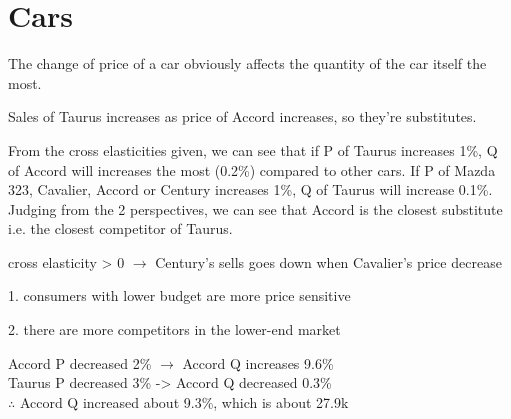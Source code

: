 \documentclass[a4paper]{article}
\begin{document}
    \section{Cars}
    \begin{answer}[Q1]
    The change of price of a car obviously affects the quantity of the car itself the most.
    \end{answer}
    \begin{answer}[Q2]
    Sales of Taurus increases as price of Accord increases, so they're substitutes.
    \end{answer}
    \begin{answer}[Q3]
    From the cross elasticities given, we can see that if P of Taurus increases 1\%, Q of Accord will increases the most (0.2\%) compared to other cars. If P of Mazda 323,  Cavalier, Accord or Century increases 1\%, Q of Taurus will increase 0.1\%. Judging from the 2 perspectives, we can see that Accord is the closest substitute i.e. the closest competitor of Taurus.
    
    \end{answer}
    \begin{answer}[Q4]
    cross elasticity > 0 $\rightarrow$ Century's sells goes down when Cavalier's price decrease
    \end{answer}
    \begin{answer}[Q5]
    1. consumers with lower budget are more price sensitive
    
    2. there are more competitors in the lower-end market
    \end{answer}
    \begin{answer}[Q6]
    Accord P decreased 2\% $\rightarrow$ Accord Q increases 9.6\%\\  
    Taurus P decreased 3\% -> Accord Q decreased 0.3\%\\  
    $\therefore$ Accord Q increased about 9.3\%, which is about 27.9k  

    \end{answer}
    
\end{document}
